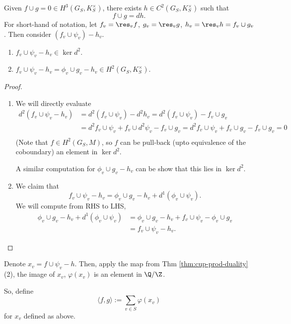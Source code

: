 \documentclass[11pt]{article}
\begin{document}
\bigskip
Given $f \cup g = 0 \in H^3 (G_S, K_S^\times)$, there exists $h \in C^2 (G_S, K_S^\times)$ such that
\[
f \cup g = d h.
\]
For short-hand of notation, let $f_v = \res_v f$, $g_v = \res_v g$, $h_v = \res_v h = f_v \cup g_v$. Then consider $(f_v \cup \psi_v) - h_v$.
\begin{claim}
    \begin{enumerate}
        \item $f_v \cup \psi_v - h_v \in \ker d^2$.
        \item $f_v \cup \psi_v -h_v = \phi_v \cup g_v - h_v \in H^2 (G_S, K_S^\times)$.
    \end{enumerate}
\end{claim}
\begin{proof}
\begin{enumerate}
    \item We will directly evaluate
    \begin{align*}
    d^2 (f_v \cup \psi_v - h_v) & = d^2 (f_v \cup \psi_v) - d^2 h_v = d^2 (f_v \cup \psi_v) - f_v \cup g_v \\
    & = d^2 f_v \cup \psi_v + f_v \cup d^2 \psi_v - f_v \cup g_v = d^2 f_v \cup \psi_v + f_v \cup g_v  - f_v \cup g_v = 0 \\
    \end{align*}
    (Note that $f \in H^2 (G_S, M)$, so $f$ can be pull-back (upto equivalence of the coboundary) an element in $\ker d^2$.

    \bigskip
    A similar computation for $\phi_v \cup g_v - h_v$ can be show that this lies in $\ker d^2$.

    \bigskip
    \item We claim that
    \[
        f_v \cup \psi_v - h_v = \phi_v \cup g_v - h_v + d^1 (\phi_v \cup \psi_v).
    \]
    We will compute from RHS to LHS,
    \begin{align}
    \phi_v \cup g_v - h_v + d^1 (\phi_v \cup \psi_v) & = \phi_v \cup g_v - h_v + f_v \cup \psi_v -\phi_v \cup g_v \\
    & = f_v \cup \psi_v - h_v.
    \end{align}
\end{enumerate}


\end{proof}

Denote $x_v = f \cup \psi_v - h$. Then, apply the map from Thm \ref{thm:cup-prod-duality} (2), the image of $x_v$, $\varphi(x_v)$ is an element in $\Q/\Z$.

\bigskip
So, define
\[
\langle f, g \rangle := \sum_{v \in S} \varphi(x_v)
\]
for $x_v$ defined as above.
\end{document}

